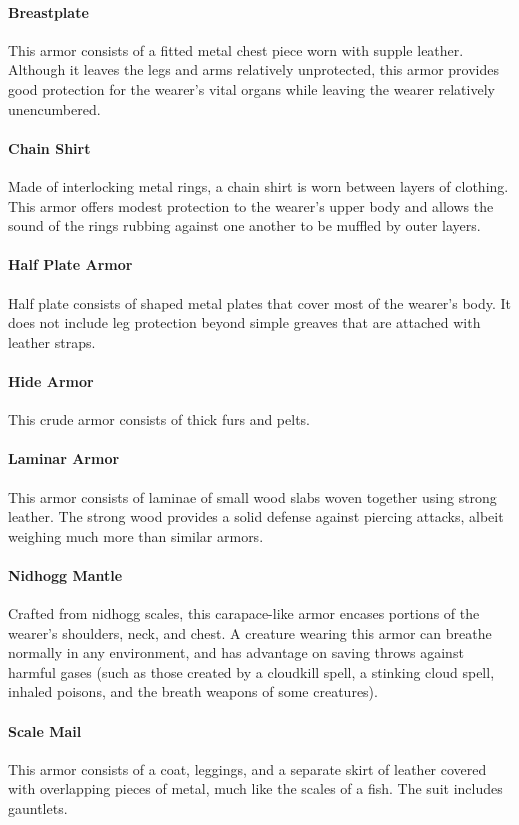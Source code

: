     \paragraph{Breastplate}
        This armor consists of a fitted metal chest piece worn with supple leather.
        Although it leaves the legs and arms relatively unprotected, this armor provides good protection for the wearer's vital organs while leaving the wearer relatively unencumbered.
    \paragraph{Chain Shirt}
        Made of interlocking metal rings, a chain shirt is worn between layers of clothing.
        This armor offers modest protection to the wearer's upper body and allows the sound of the rings rubbing against one another to be muffled by outer layers.
    \paragraph{Half Plate Armor}
        Half plate consists of shaped metal plates that cover most of the wearer's body.
        It does not include leg protection beyond simple greaves that are attached with leather straps.
    \paragraph{Hide Armor}
        This crude armor consists of thick furs and pelts.
    \paragraph{Laminar Armor}
        This armor consists of laminae of small wood slabs woven together using strong leather.
        The strong wood provides a solid defense against piercing attacks, albeit weighing much more than similar armors.
    \paragraph{Nidhogg Mantle}
        Crafted from nidhogg scales, this carapace-like armor encases portions of the wearer's shoulders, neck, and chest.
        A creature wearing this armor can breathe normally in any environment, and has advantage on saving throws against harmful gases (such as those created by a cloudkill spell, a stinking cloud spell, inhaled poisons, and the breath weapons of some creatures).
    \paragraph{Scale Mail}
        This armor consists of a coat, leggings, and a separate skirt of leather covered with overlapping pieces of metal, much like the scales of a fish.
        The suit includes gauntlets.
